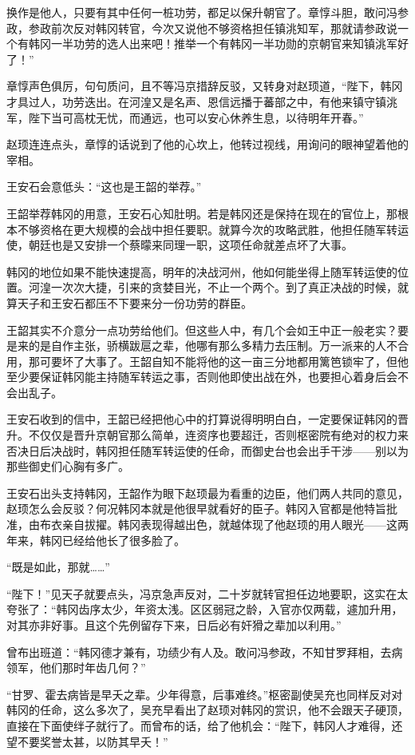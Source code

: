 换作是他人，只要有其中任何一桩功劳，都足以保升朝官了。章惇斗胆，敢问冯参政，参政前次反对韩冈转官，今次又说他不够资格担任镇洮知军，那就请参政说一个有韩冈一半功劳的选人出来吧！推举一个有韩冈一半功勋的京朝官来知镇洮军好了！”

章惇声色俱厉，句句质问，且不等冯京措辞反驳，又转身对赵顼道，“陛下，韩冈才具过人，功劳迭出。在河湟又是名声、恩信远播于蕃部之中，有他来镇守镇洮军，陛下当可高枕无忧，而通远，也可以安心休养生息，以待明年开春。”

赵顼连连点头，章惇的话说到了他的心坎上，他转过视线，用询问的眼神望着他的宰相。

王安石会意低头：“这也是王韶的举荐。”

王韶举荐韩冈的用意，王安石心知肚明。若是韩冈还是保持在现在的官位上，那根本不够资格在更大规模的会战中担任要职。就算今次的攻略武胜，他担任随军转运使，朝廷也是又安排一个蔡曚来同理一职，这项任命就差点坏了大事。

韩冈的地位如果不能快速提高，明年的决战河州，他如何能坐得上随军转运使的位置。河湟一次次大捷，引来的贪婪目光，不止一个两个。到了真正决战的时候，就算天子和王安石都压不下要来分一份功劳的群臣。

王韶其实不介意分一点功劳给他们。但这些人中，有几个会如王中正一般老实？要是来的是自作主张，骄横跋扈之辈，他哪有那么多精力去压制。万一派来的人不合用，那可要坏了大事了。王韶自知不能将他的这一亩三分地都用篱笆锁牢了，但他至少要保证韩冈能主持随军转运之事，否则他即使出战在外，也要担心着身后会不会出乱子。

王安石收到的信中，王韶已经把他心中的打算说得明明白白，一定要保证韩冈的晋升。不仅仅是晋升京朝官那么简单，连资序也要超迁，否则枢密院有绝对的权力来否决日后决战时，韩冈担任随军转运使的任命，而御史台也会出手干涉——别以为那些御史们心胸有多广。

王安石出头支持韩冈，王韶作为眼下赵顼最为看重的边臣，他们两人共同的意见，赵顼怎么会反驳？何况韩冈本就是他很早就看好的臣子。韩冈入官都是他特旨批准，由布衣亲自拔擢。韩冈表现得越出色，就越体现了他赵顼的用人眼光——这两年来，韩冈已经给他长了很多脸了。

“既是如此，那就……”

“陛下！”见天子就要点头，冯京急声反对，二十岁就转官担任边地要职，这实在太夸张了：“韩冈齿序太少，年资太浅。区区弱冠之龄，入官亦仅两载，遽加升用，对其亦非好事。且这个先例留存下来，日后必有奸猾之辈加以利用。”

曾布出班道：“韩冈德才兼有，功绩少有人及。敢问冯参政，不知甘罗拜相，去病领军，他们那时年齿几何？”

“甘罗、霍去病皆是早夭之辈。少年得意，后事难终。”枢密副使吴充也同样反对对韩冈的任命，这么多次了，吴充早看出了赵顼对韩冈的赏识，他不会跟天子硬顶，直接在下面使绊子就行了。而曾布的话，给了他机会：“陛下，韩冈人才难得，还望不要奖誉太甚，以防其早夭！”

